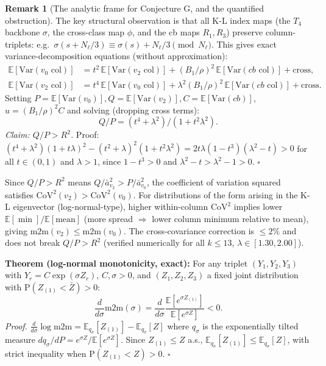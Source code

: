 \documentclass[11pt]{article}
\theoremstyle{definition}
\newtheorem{remark}[theorem]{Remark}
\begin{document}
\begin{remark}[The analytic frame for Conjecture G, and the quantified
obstruction]
The key structural observation is that all K-L index maps (the $T_4$ backbone
$\sigma$, the cross-class map $\phi$, and the cb maps $R_1, R_3$) preserve
column-triplets: e.g.\ $\sigma(s + N_\ell/3) \equiv \sigma(s) + N_\ell/3 \pmod{N_\ell}$.
This gives exact variance-decomposition equations (without approximation):
\begin{align*}
  \mathbb{E}[\mathrm{Var}(v_0\text{ col})] &= t^2\,\mathbb{E}[\mathrm{Var}(v_2\text{ col})]
    + (B_1/\rho)^2\,\mathbb{E}[\mathrm{Var}(cb\text{ col})] + \text{cross},\\
  \mathbb{E}[\mathrm{Var}(v_2\text{ col})] &= t^4\,\mathbb{E}[\mathrm{Var}(v_0\text{ col})]
    + \lambda^2(B_1/\rho)^2\,\mathbb{E}[\mathrm{Var}(cb\text{ col})] + \text{cross}.
\end{align*}
Setting $P = \mathbb{E}[\mathrm{Var}(v_0)], Q = \mathbb{E}[\mathrm{Var}(v_2)], C =
\mathbb{E}[\mathrm{Var}(cb)]$, $u = (B_1/\rho)^2 C$ and solving (dropping cross terms):
\[
  Q/P = (t^4 + \lambda^2)/(1 + t^2\lambda^2).
\]
\emph{Claim: $Q/P > R^2$.}
Proof: $(t^4+\lambda^2)(1+t\lambda)^2 - (t^2+\lambda)^2(1+t^2\lambda^2)
= 2t\lambda(1-t^3)(\lambda^2-t) > 0$
for all $t \in (0,1)$ and $\lambda > 1$, since $1-t^3>0$ and $\lambda^2-t > \lambda^2-1 > 0$.
$\square$

Since $Q/P > R^2$ means $Q/\bar a_{v_2}^2 > P/\bar a_{v_0}^2$, the coefficient of
variation squared satisfies $\mathrm{CoV}^2(v_2) > \mathrm{CoV}^2(v_0)$.
For distributions of the form arising in the K-L eigenvector (log-normal-type), higher
within-column $\mathrm{CoV}^2$ implies lower $\mathbb{E}[\min]/\mathbb{E}[\text{mean}]$
(more spread $\Rightarrow$ lower column minimum relative to mean), giving
$\mathrm{m2m}(v_2) \le \mathrm{m2m}(v_0)$.
The cross-covariance correction is $\le 2\%$ and does not break $Q/P > R^2$
(verified numerically for all $k \le 13$, $\lambda \in [1.30, 2.00]$).

\textbf{Theorem (log-normal monotonicity, exact):}
For any triplet $(Y_1,Y_2,Y_3)$ with $Y_r = C\exp(\sigma Z_r)$, $C,\sigma>0$, and
$(Z_1,Z_2,Z_3)$ a fixed joint distribution with $\mathrm{P}(Z_{(1)} < \bar Z) > 0$:
\[
\frac{d}{d\sigma}\mathrm{m2m}(\sigma) =
\frac{d}{d\sigma}\frac{\mathbb{E}[e^{\sigma Z_{(1)}}]}{\mathbb{E}[e^{\sigma Z}]} < 0.
\]
\emph{Proof.}
$\frac{d}{d\sigma}\log\mathrm{m2m} = \mathbb{E}_{q_\sigma}[Z_{(1)}] - \mathbb{E}_{q_\sigma}[Z]$
where $q_\sigma$ is the exponentially tilted measure
$dq_\sigma/dP = e^{\sigma Z}/\mathbb{E}[e^{\sigma Z}]$.
Since $Z_{(1)} \le Z$ a.s., $\mathbb{E}_{q_\sigma}[Z_{(1)}] \le \mathbb{E}_{q_\sigma}[Z]$,
with strict inequality when $\mathrm{P}(Z_{(1)} < Z) > 0$.
$\square$


\end{remark}
\end{document}
